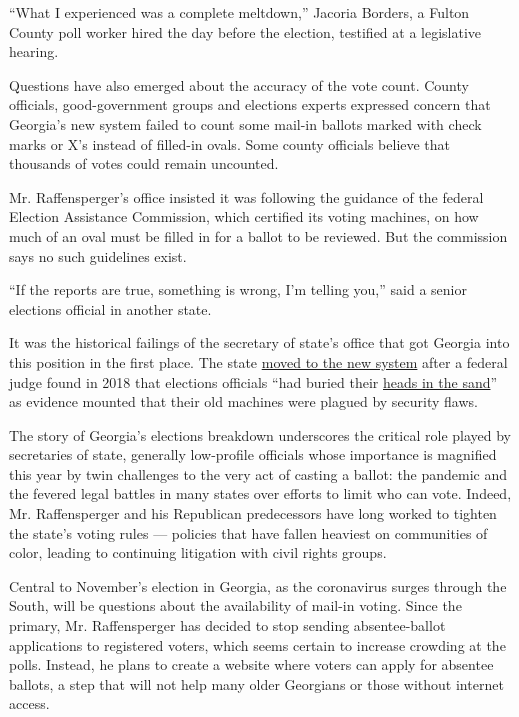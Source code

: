 ``What I experienced was a complete meltdown,'' Jacoria Borders, a
Fulton County poll worker hired the day before the election, testified
at a legislative hearing.

Questions have also emerged about the accuracy of the vote count. County
officials, good-government groups and elections experts expressed
concern that Georgia's new system failed to count some mail-in ballots
marked with check marks or X's instead of filled-in ovals. Some county
officials believe that thousands of votes could remain uncounted.

Mr. Raffensperger's office insisted it was following the guidance of the
federal Election Assistance Commission, which certified its voting
machines, on how much of an oval must be filled in for a ballot to be
reviewed. But the commission says no such guidelines exist.

``If the reports are true, something is wrong, I'm telling you,'' said a
senior elections official in another state.

It was the historical failings of the secretary of state's office that
got Georgia into this position in the first place. The state
\href{https://www.ajc.com/news/state—regional-govt--politics/companies-submit-confidential-bids-for-georgia-voting-system/SYsJ3vS3OxKYLKRw3BCDdK/}{moved
to the new system} after a federal judge found in 2018 that elections
officials ``had buried their
\href{https://www.documentcloud.org/documents/6989937-Curling-2018-Decision.html}{heads
in the sand}'' as evidence mounted that their old machines were plagued
by security flaws.

The story of Georgia's elections breakdown underscores the critical role
played by secretaries of state, generally low-profile officials whose
importance is magnified this year by twin challenges to the very act of
casting a ballot: the pandemic and the fevered legal battles in many
states over efforts to limit who can vote. Indeed, Mr. Raffensperger and
his Republican predecessors have long worked to tighten the state's
voting rules --- policies that have fallen heaviest on communities of
color, leading to continuing litigation with civil rights groups.

Central to November's election in Georgia, as the coronavirus surges
through the South, will be questions about the availability of mail-in
voting. Since the primary, Mr. Raffensperger has decided to stop sending
absentee-ballot applications to registered voters, which seems certain
to increase crowding at the polls. Instead, he plans to create a website
where voters can apply for absentee ballots, a step that will not help
many older Georgians or those without internet access.

